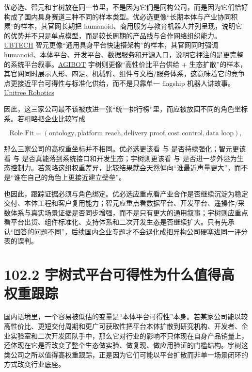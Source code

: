 优必选、智元和宇树放在同一节里，不是因为它们是同构公司，而是因为它们恰好构成了国内具身赛道三种不同的样本类型。优必选更像“长期本体与产业协同积累”的样本，其官网长期把 humanoid、商用服务与教育机器人并列呈现，说明它的优势并不只是单点模型，而是较长周期的产品线与合作网络组织能力。\href{https://www.ubtrobot.com/}{UBTECH} 智元更像“通用具身平台快速搭架构”的样本，其官网同时强调 humanoid、本体平台、开发平台、数据服务和开源入口，说明它押注的是更完整的系统平台叙事。\href{https://www.agibot.com/}{AGIBOT} 宇树则更像“高性价比平台供给 + 生态扩散”的样本，其官网同时展示人形、四足、机械臂、组件与文档/服务体系，这意味着它的竞争点更接近平台可得性与标准化供给，而不是只靠单一 flagship 机器人讲故事。\href{https://www.unitree.com/}{Unitree Robotics}

因此，这三家公司最不该被放进一张“统一排行榜”里，而应被放回不同的角色坐标系。若粗略把企业比较写成

\begingroup
\scriptsize
\begin{equation*}
\text{Role Fit} = (\text{ontology}, \text{platform reach}, \text{delivery proof}, \text{cost control}, \text{data loop}),
\end{equation*}
\endgroup

那么三家公司的高权重坐标并不相同。优必选更该看 \texttt{} 与 \texttt{} 是否持续强化；智元更该看 \texttt{} 与 \texttt{} 是否真能落到系统接口和开发生态；宇树则更该看 \texttt{} 与 \texttt{} 是否进一步外溢为生态控制力。若忽略这组权重差异，比较结果就会天然偏向“谁最近声量更大”，而不是“谁在自己的角色上更接近建立壁垒”。

也因此，跟踪证据必须与角色绑定。优必选应重点看产业合作是否继续沉淀为稳定交付、本体工程和客户复用能力；智元应重点看数据平台、开发平台、遥操作/采数体系与真实场景证据是否同步增强，而不是只有更大的通用叙事；宇树则应重点看平台出货、组件标准化、支持体系和二次开发生态是否继续扩大。只有先承认“回答的问题不同”，后续国内企业专题才不会退化成把异构公司硬塞进同一评分表的误判。

\section*{102.2 宇树式平台可得性为什么值得高权重跟踪}


国内语境里，一个容易被低估的变量是“本体平台可得性”本身。若某家公司能以较高性价比、更短交付周期和更广可获取性把平台本体扩散到研究机构、开发者、企业实验室和二次开发团队手中，那么它对行业的影响不只体现在自身产品销量上，还体现在它是否改变了整个生态做实验、做复现、做应用验证的门槛结构。宇树这类公司之所以值得高权重跟踪，正是因为它们可能以平台扩散而非单一场景闭环的方式改变行业底座。

